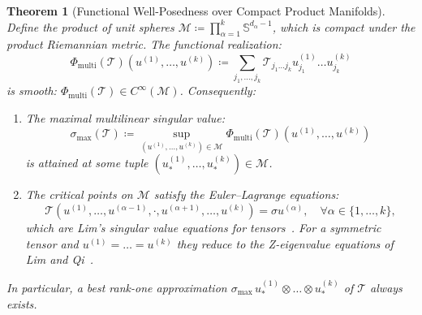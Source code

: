 \documentclass[11pt,a4paper,reqno]{amsart}
\newtheorem{theorem}{Theorem}[section]
\theoremstyle{definition}
\numberwithin{equation}{section}
\providecommand{\Sph}{\mathbb{S}}
\begin{document}
\begin{theorem}[Functional Well-Posedness over Compact Product Manifolds]
\label{thm:tensor_weierstrass}
Define the product of unit spheres $\mathcal{M} \coloneqq \prod_{\alpha=1}^k \Sph^{d_\alpha - 1}$, which is compact under the product Riemannian metric. The functional realization:
\begin{equation}
    \Phi_{\mathrm{multi}}(\mathcal{T})(u^{(1)}, \dots, u^{(k)}) \coloneqq \sum_{j_1, \dots, j_k} \mathcal{T}_{j_1 \dots j_k} u_{j_1}^{(1)} \dots u_{j_k}^{(k)}
\end{equation}
is smooth: $\Phi_{\mathrm{multi}}(\mathcal{T}) \in C^\infty(\mathcal{M})$. Consequently:
\begin{enumerate}[label=(\roman*)]
    \item The maximal multilinear singular value:
    \begin{equation}
        \sigma_{\max}(\mathcal{T}) \coloneqq \sup_{(u^{(1)}, \dots, u^{(k)}) \in \mathcal{M}} \Phi_{\mathrm{multi}}(\mathcal{T})(u^{(1)}, \dots, u^{(k)})
    \end{equation}
    is attained at some tuple $(u_*^{(1)}, \dots, u_*^{(k)}) \in \mathcal{M}$.
    \item The critical points on $\mathcal{M}$ satisfy the Euler--Lagrange equations:
    \begin{equation}
        \label{eq:tensor_critical}
        \mathcal{T}(u^{(1)}, \dots, u^{(\alpha-1)}, \cdot, u^{(\alpha+1)}, \dots, u^{(k)}) = \sigma u^{(\alpha)}, \quad \forall \alpha \in \{1, \dots, k\},
    \end{equation}
    which are Lim's singular value equations for tensors~\cite{lim2005singular}. For a symmetric tensor and $u^{(1)} = \dots = u^{(k)}$ they reduce to the Z-eigenvalue equations of Lim and Qi~\cite{lim2005singular,qi2005eigenvalues}.
\end{enumerate}
In particular, a best rank-one approximation $\sigma_{\max}\, u_*^{(1)} \otimes \dots \otimes u_*^{(k)}$ of $\mathcal{T}$ always exists.
\end{theorem}
\end{document}
